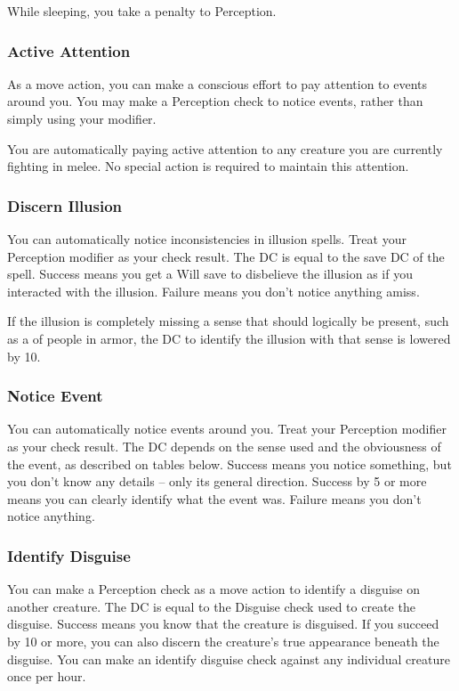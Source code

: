 While sleeping, you take a  penalty to Perception.

\subsubsection{Active Attention}
As a move action, you can make a conscious effort to pay attention to events around you. You may make a Perception check to notice events, rather than simply using your modifier.

You are automatically paying active attention to any creature you are currently fighting in melee. No special action is required to maintain this attention.

\subsubsection{Discern Illusion}
You can automatically notice inconsistencies in illusion spells. Treat your Perception modifier as your check result. The DC is equal to the save DC of the spell. Success means you get a Will save to disbelieve the illusion as if you interacted with the illusion. Failure means you don't notice anything amiss.

If the illusion is completely missing a sense that should logically be present, such as a  of people in armor, the DC to identify the illusion with that sense is lowered by 10. 

\subsubsection{Notice Event}
You can automatically notice events around you. Treat your Perception modifier as your check result. The DC depends on the sense used and the obviousness of the event, as described on tables below. Success means you notice something, but you don't know any details -- only its general direction. Success by 5 or more means you can clearly identify what the event was. Failure means you don't notice anything.

\subsubsection{Identify Disguise}
You can make a Perception check as a move action to identify a disguise on another creature. The DC is equal to the Disguise check used to create the disguise. Success means you know that the creature is disguised. If you succeed by 10 or more, you can also discern the creature's true appearance beneath the disguise. You can make an identify disguise check against any individual creature once per hour.

